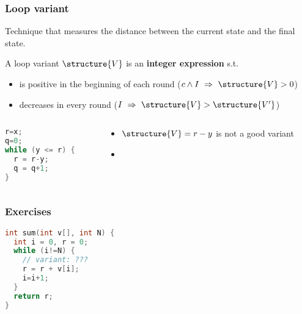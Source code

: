 \documentclass[aspectratio=169]{beamer}
\begin{document}
\begin{frame}[fragile]\frametitle{Loop variant}
  
  Technique that measures the distance between the current state and the final state.

  \begin{block}{A loop variant $\structure{V}$ is an \textbf{integer expression} s.t.}
    \begin{itemize}
      \item is positive in the beginning of each round ($c \land I ~\Rightarrow~ \structure{V}>0$)
      \item decreases in every round ($I ~\Rightarrow~ \structure{V} > \structure{V'}$)
    \end{itemize}
  \end{block}

\begin{columns}
\begin{column}{0.48\textwidth}
\begin{lstlisting}[language=C++]
r=x;
q=0;
while (y <= r) {
  r = r-y;
  q = q+1;
}
\end{lstlisting}
\end{column}
\begin{column}{0.48\textwidth}
  \begin{itemize}
    \item $\structure{V} = r-y$ is not a good variant
    \item {}

  \end{itemize}
\end{column}
\end{columns}

\end{frame}

\begin{frame}[fragile]\frametitle{Exercises}

\begin{lstlisting}[language=C++]
int sum(int v[], int N) {
  int i = 0, r = 0;
  while (i!=N) {
    // variant: ???
    r = r + v[i];
    i=i+1;
  }
  return r;
}
\end{lstlisting}

~\\[-10mm]


\end{frame}
\end{document}
